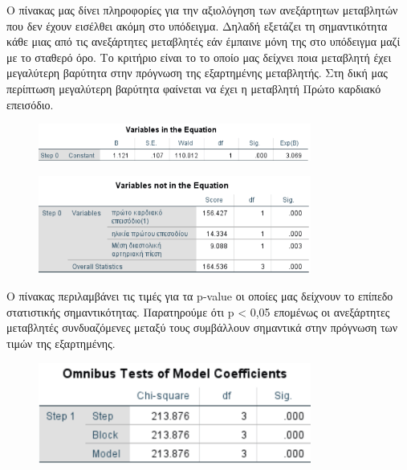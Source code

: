 Ο πίνακας \textbf{} μας δίνει πληροφορίες για την αξιολόγηση των ανεξάρτητων μεταβλητών που δεν έχουν εισέλθει ακόμη στο υπόδειγμα. Δηλαδή εξετάζει τη σημαντικότητα κάθε μιας από τις ανεξάρτητες μεταβλητές εάν έμπαινε μόνη της στο υπόδειγμα μαζί με το σταθερό όρο. Το κριτήριο είναι το \textbf{} το οποίο μας δείχνει ποια μεταβλητή έχει μεγαλύτερη βαρύτητα στην πρόγνωση της εξαρτημένης μεταβλητής. Στη δική μας περίπτωση μεγαλύτερη βαρύτητα φαίνεται να έχει η μεταβλητή Πρώτο καρδιακό επεισόδιο.   

\clearpage

\begin{figure}[h]
    \centering
    \includegraphics[width=0.8\textwidth]{images/505.PNG}
\end{figure}

\begin{figure}[h]
    \centering
    \includegraphics[width=0.8\textwidth]{images/506.PNG}
\end{figure}

\vspace{1cm}
Ο πίνακας \textbf{} περιλαμβάνει τις τιμές για τα p-value οι οποίες μας δείχνουν το επίπεδο στατιστικής σημαντικότητας. Παρατηρούμε ότι p < 0,05 επομένως οι ανεξάρτητες μεταβλητές συνδυαζόμενες μεταξύ τους συμβάλλουν σημαντικά στην πρόγνωση των τιμών της εξαρτημένης. 
\vspace{1cm}

\begin{figure}[h]
    \centering
    \includegraphics[width=0.8\textwidth]{images/507.PNG}
\end{figure}

